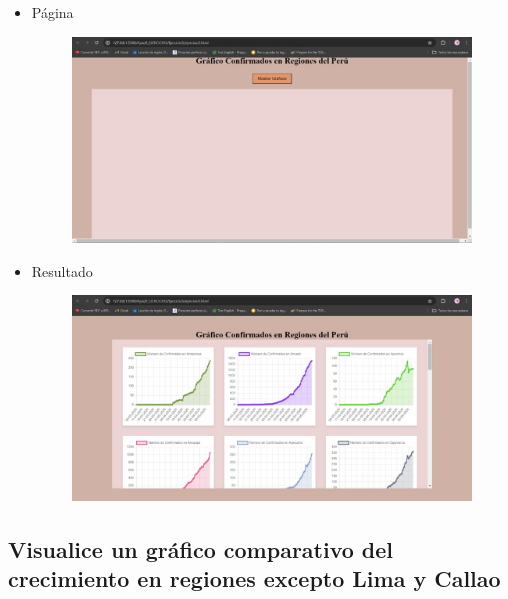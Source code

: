 \documentclass{article}
\begin{document}
\begin{itemize}
\begin{figure}[H]
		\end{figure}
		\item Página
		\begin{figure}[H]
			\centering
			\includegraphics[width=1.0\textwidth,keepaspectratio]{img/Ejer5T2Pagina.jpg}
		\end{figure}
		\item Resultado
		\begin{figure}[H]
			\centering
			\includegraphics[width=1.0\textwidth,keepaspectratio]{img/Ejer5T2Result.jpg}
		\end{figure}
	\end{itemize}
	
	\subsection{Visualice un gráfico comparativo del crecimiento en regiones excepto Lima y Callao}
	
\end{document}

